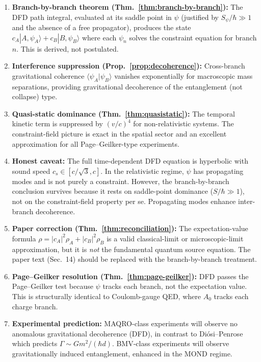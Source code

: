 \documentclass[11pt,a4paper]{article}
\begin{document}
\begin{enumerate}
\item \textbf{Branch-by-branch theorem (Thm.~\ref{thm:branch-by-branch}):}
The DFD path integral, evaluated at its saddle point in $\psi$
(justified by $S_\psi/\hbar \gg 1$ and the absence of a free
propagator), produces the state
$c_A|A,\psi_A\rangle + c_B|B,\psi_B\rangle$ where each $\psi_n$
solves the constraint equation for branch $n$. This is derived, not
postulated.

\item \textbf{Interference suppression (Prop.~\ref{prop:decoherence}):}
Cross-branch gravitational coherence
$\langle\psi_A|\psi_B\rangle$ vanishes exponentially for macroscopic
mass separations, providing gravitational decoherence of the
entanglement (not collapse) type.

\item \textbf{Quasi-static dominance (Thm.~\ref{thm:quasistatic}):}
The temporal kinetic term is suppressed by $(v/c)^4$ for
non-relativistic systems. The constraint-field picture is exact in the
spatial sector and an excellent approximation for all Page--Geilker-type
experiments.

\item \textbf{Honest caveat:} The full time-dependent DFD equation is
hyperbolic with sound speed $c_s \in [c/\sqrt{3}, c]$. In the
relativistic regime, $\psi$ has propagating modes and is not purely a
constraint. However, the branch-by-branch conclusion survives because it
rests on saddle-point dominance ($S/\hbar \gg 1$), not on the
constraint-field property per se. Propagating modes enhance
inter-branch decoherence.

\item \textbf{Paper correction (Thm.~\ref{thm:reconciliation}):}
The expectation-value formula $\rho = |c_A|^2\rho_A + |c_B|^2\rho_B$
is a valid classical-limit or microscopic-limit approximation, but it
is \emph{not} the fundamental quantum source equation. The paper text
(Sec.~14) should be replaced with the branch-by-branch treatment.

\item \textbf{Page--Geilker resolution (Thm.~\ref{thm:page-geilker}):}
DFD passes the Page--Geilker test because $\psi$ tracks each branch,
not the expectation value. This is structurally identical to Coulomb-gauge
QED, where $A_0$ tracks each charge branch.

\item \textbf{Experimental prediction:} MAQRO-class experiments will
observe no anomalous gravitational decoherence (DFD), in contrast to
Di\'osi--Penrose which predicts $\Gamma \sim Gm^2/(\hbar d)$.
BMV-class experiments will observe gravitationally induced entanglement,
enhanced in the MOND regime.
\end{enumerate}
\end{document}
